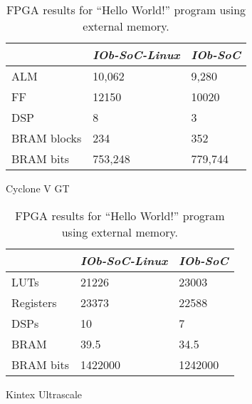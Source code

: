 \begin{table}[!ht]
    \begin{subtable}[h]{0.45\textwidth}
        \centering
        \begin{tabular}{l|l|l|}
            \cline{2-3}
                                              & \textit{IOb-SoC-Linux} & \textit{IOb-SoC} \\ \hline
            \multicolumn{1}{|l|}{ALM}         & 10,062                 & 9,280            \\ \hline
            \multicolumn{1}{|l|}{FF}          & 12150                  & 10020            \\ \hline
            \multicolumn{1}{|l|}{DSP}         & 8                      & 3                \\ \hline
            \multicolumn{1}{|l|}{BRAM blocks} & 234                    & 352              \\ \hline
            \multicolumn{1}{|l|}{BRAM bits}   & 753,248                & 779,744          \\ \hline
        \end{tabular}
       \caption{Cyclone V GT}
       \label{tab:cyclone_hello}
    \end{subtable}
    \hfill
    \begin{subtable}[h]{0.45\textwidth}
        \centering
        \begin{tabular}{l|l|l|}
            \cline{2-3}
                                                     & \textit{IOb-SoC-Linux} & \textit{IOb-SoC} \\ \hline
            \multicolumn{1}{|l|}{LUTs}               & 21226                  & 23003            \\ \hline
            \multicolumn{1}{|l|}{Registers}          & 23373                  & 22588            \\ \hline
            \multicolumn{1}{|l|}{DSPs}               & 10                     & 7                \\ \hline
            \multicolumn{1}{|l|}{BRAM \footnotemark} & 39.5                   & 34.5             \\ \hline
            \multicolumn{1}{|l|}{BRAM bits}          & 1422000                & 1242000          \\ \hline
        \end{tabular}
        \caption{Kintex Ultrascale}
        \label{tab:kintex_hello}
     \end{subtable}
     \caption{FPGA results for \enquote{Hello World!} program using external memory.}
     \label{tab:fpga_hello}
\end{table}

